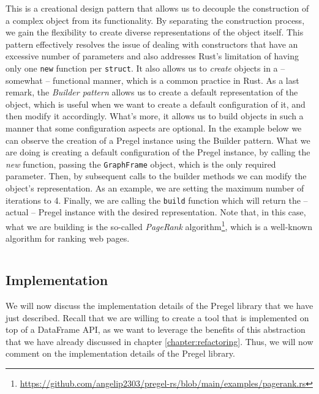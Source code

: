 This is a creational design pattern that allows us to decouple the construction of a complex object from its functionality. By separating the construction process, we gain the flexibility to create diverse representations of the object itself. This pattern effectively resolves the issue of dealing with constructors that have an excessive number of parameters and also addresses Rust's limitation of having only one \texttt{new} function per \texttt{struct}. It also allows us to \textit{create} objects in a -- somewhat -- functional manner, which is a common practice in Rust. As a last remark, the \textit{Builder pattern} allows us to create a default representation of the object, which is useful when we want to create a default configuration of it, and then modify it accordingly. What's more, it allows us to build objects in such a manner that some configuration aspects are optional. In the example below we can observe the creation of a Pregel instance using the Builder pattern. What we are doing is creating a default configuration of the Pregel instance, by calling the \textit{new} function, passing the \texttt{GraphFrame} object, which is the only required parameter. Then, by subsequent calls to the builder methods we can modify the object's representation. As an example, we are setting the maximum number of iterations to 4. Finally, we are calling the \texttt{build} function which will return the -- actual -- Pregel instance with the desired representation. Note that, in this case, what we are building is the so-called \textit{PageRank} algorithm\footnote{\url{https://github.com/angelip2303/pregel-rs/blob/main/examples/pagerank.rs}}, which is a well-known algorithm for ranking web pages.

\begin{code}
    \inputminted{rust}{code/listings/11-3_pagerank.rs}
\end{code}

\vspace*{1em}

\subsection{Implementation}

We will now discuss the implementation details of the Pregel library that we have just described. Recall that we are willing to create a tool that is implemented on top of a DataFrame API, as we want to leverage the benefits of this abstraction that we have already discussed in chapter \ref{chapter:refactoring}. Thus, we will now comment on the implementation details of the Pregel library.

